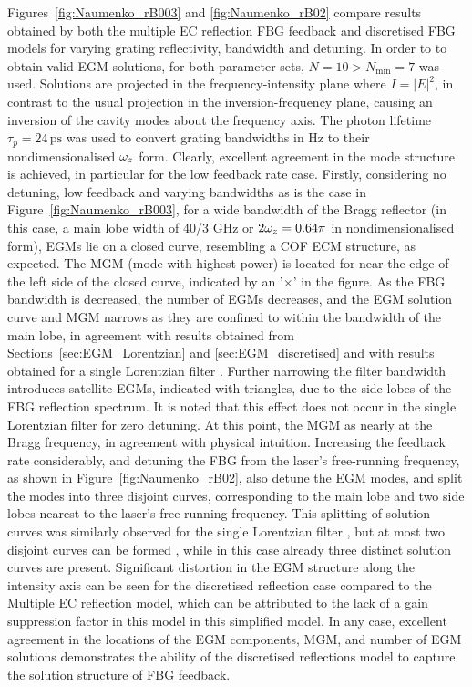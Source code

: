 Figures~\ref{fig:Naumenko_rB003} and \ref{fig:Naumenko_rB02} compare results obtained by both the multiple EC reflection FBG feedback and discretised FBG models for varying grating reflectivity, bandwidth and detuning. In order to to obtain valid EGM solutions, for both parameter sets, $N=10 > N_\text{min}=7$ was used. Solutions are projected in the frequency-intensity plane where $I = |E|^2$, in contrast to the usual projection in the inversion-frequency plane, causing an inversion of the cavity modes about the frequency axis. The photon lifetime $\tau_p=24\,\text{ps}$ was used to convert grating bandwidths in Hz to their nondimensionalised $\omega_z$ form. Clearly, excellent agreement in the mode structure is achieved, in particular for the low feedback rate case. Firstly, considering no detuning, low feedback and varying bandwidths as is the case in Figure~\ref{fig:Naumenko_rB003}, for a wide bandwidth of the Bragg reflector (in this case, a main lobe width of 40/3 GHz or $2\omega_z=0.64\pi$ in nondimensionalised form), EGMs lie on a closed curve, resembling a COF ECM structure, as expected. The MGM (mode with highest power) is located for near the edge of the left side of the closed curve, indicated by an '$\times$' in the figure. As the FBG bandwidth is decreased, the number of EGMs decreases, and the EGM solution curve and MGM narrows as they are confined to within the bandwidth of the main lobe, in agreement with results obtained from Sections~\ref{sec:EGM_Lorentzian} and \ref{sec:EGM_discretised} and with results obtained for a single Lorentzian filter \cite{yousefi1999dynamical}. Further narrowing the filter bandwidth introduces satellite EGMs, indicated with triangles, due to the side lobes of the FBG reflection spectrum. It is noted that this effect does not occur in the single Lorentzian filter for zero detuning. At this point, the MGM as nearly at the Bragg frequency, in agreement with physical intuition. Increasing the feedback rate considerably, and detuning the FBG from the laser's free-running frequency, as shown in Figure~\ref{fig:Naumenko_rB02}, also detune the EGM modes, and split the modes into three disjoint curves, corresponding to the main lobe and two side lobes nearest to the laser's free-running frequency. This splitting of solution curves was similarly observed for the single Lorentzian filter \cite{yousefi1999dynamical}, but at most two disjoint curves can be formed \cite{green2006mode}, while in this case already three distinct solution curves are present. Significant distortion in the EGM structure along the intensity axis can be seen for the discretised reflection case compared to the Multiple EC reflection model, which can be attributed to the lack of a gain suppression factor in this model in this simplified model. In any case, excellent agreement in the locations of the EGM components, MGM, and number of EGM solutions demonstrates the ability of the discretised reflections model to capture the solution structure of FBG feedback.
%
\par
%
    

